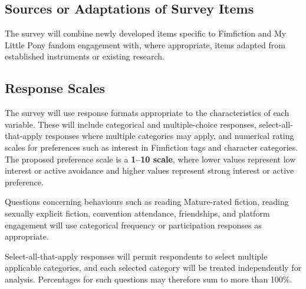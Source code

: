 
\subsection{Sources or Adaptations of Survey Items}


The survey will combine newly developed items specific to Fimfiction and My Little Pony fandom engagement with, where appropriate, items adapted from established instruments or existing research.


\subsection{Response Scales}

The survey will use response formats appropriate to the characteristics of each variable. These will include categorical and multiple-choice responses, select-all-that-apply responses where multiple categories may apply, and numerical rating scales for preferences such as interest in Fimfiction tags and character categories. The proposed preference scale is a \textbf{1--10 scale}, where lower values represent low interest or active avoidance and higher values represent strong interest or active preference.

Questions concerning behaviours such as reading Mature-rated fiction, reading sexually explicit fiction, convention attendance, friendships, and platform engagement will use categorical frequency or participation responses as appropriate.

Select-all-that-apply responses will permit respondents to select multiple applicable categories, and each selected category will be treated independently for analysis. Percentages for such questions may therefore sum to more than 100\%.


